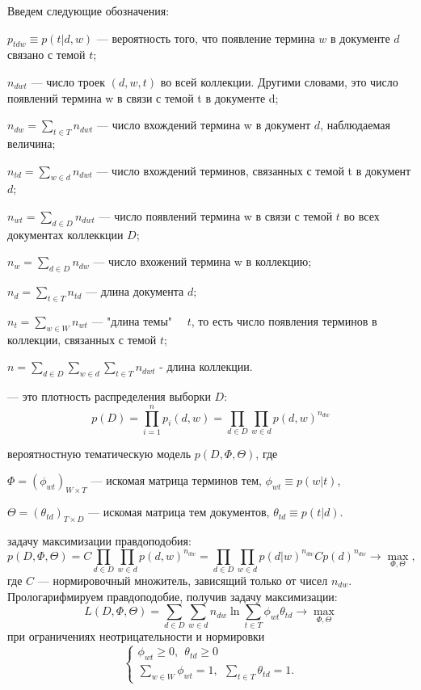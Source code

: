 \documentclass[12pt, twoside]{article}
\begin{document}
Введем следующие обозначения:

$p_{tdw} \equiv p(t|d,w)$ --- вероятность того, что появление термина $w$ в документе $d$ связано с темой $t$;

$n_{dwt}$ --- число троек $(d,w,t)$ во всей коллекции. Другими словами, это число появлений термина w в связи с темой t в документе d;

$n_{dw} = \sum_{t \in T} n_{dwt}$ --- число вхождений термина w в документ $d$,  наблюдаемая величина;

$n_{td} = \sum_{w \in d} n_{dwt}$ --- число вхождений  терминов, связанных с темой t в документ $d$;

$n_{wt} = \sum_{d \in D} n_{dwt}$ --- число появлений термина w в связи с темой $t$ во всех документах коллеккции $D$;

$n_{w} = \sum_{d \in D} n_{dw}$ --- число вхожений термина w в коллекцию;

$n_{d} = \sum_{t \in T} n_{td}$ --- длина документа $d$;

$n_{t} = \sum_{w \in W} n_{wt}$ --- "длина темы" \ \ $t$, то есть число появления терминов в коллекции, связанных с темой $t$;

$n = \sum_{d \in D}\sum_{w \in d}\sum_{t \in T} n_{dwt}$ - длина коллекции.

 ---  это плотность распределения выборки $D$:
\[
p(D)=\prod^n_{i=1}p_i(d,w)=\prod_{d \in D}\prod_{w \in d}p(d,w)^{n_{dw}}
\]

 вероятностную тематическую модель $p(D,\Phi,\Theta)$, где 

$\Phi=(\phi_{wt})_{W \times T}$ --- искомая матрица терминов тем, $\phi_{wt} \equiv p(w|t)$,

$\Theta=(\theta_{td})_{T \times D}$ --- искомая матрица тем документов, $\theta_{td}\equiv p(t|d)$.

 задачу максимизации правдоподобия:
\[
p(D,\Phi,\Theta)=C\prod_{d \in D}\prod_{w \in d}p(d,w)^{n_{dw}}=\prod_{d \in D}\prod_{w \in d}p(d|w)^{n_{dw}}Cp(d)^{n_{dw}} \to \max_{\Phi,\Theta},
\]
где $C$ --- нормировочный множитель, зависящий только от чисел $n_{dw}$. Прологарифмируем правдоподобие, получив задачу максимизации:
\[
L(D,\Phi,\Theta)=\sum_{d \in D}\sum_{w \in d}n_{dw}\ln\sum_{t \in T}\phi_{wt}\theta_{td} \to \max_{\Phi,\Theta}
\]
при ограничениях неотрицательности и нормировки
\[
\left\{
	\begin{aligned}
		\phi_{wt} \geq 0,~~\theta_{td} \geq 0\\
		\sum_{w \in W} \phi_{wt} = 1,~~\sum_{t \in T} \theta_{td}  = 1.
	\end{aligned}
\right.
\]
\end{document}
